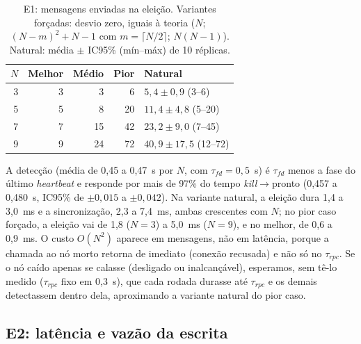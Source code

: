 \documentclass[conference,a4paper]{IEEEtran}
\begin{document}
\begin{table}[!ht]
\caption{E1: mensagens enviadas na eleição. Variantes forçadas: desvio zero, iguais à teoria ($N$; $(N-m)^2+N-1$ com $m=\lceil N/2\rceil$; $N(N-1)$). Natural: média $\pm$ IC95\% (mín--máx) de 10 réplicas.}
\label{tab:e1}
\centering
\footnotesize
\setlength{\tabcolsep}{4pt}
\begin{tabular}{@{}rrrrl@{}}
\toprule
$N$ & Melhor & Médio & Pior & Natural \\
\midrule
3 & 3 & 3 & 6 & $5{,}4\pm0{,}9$ (3--6) \\
5 & 5 & 8 & 20 & $11{,}4\pm4{,}8$ (5--20) \\
7 & 7 & 15 & 42 & $23{,}2\pm9{,}0$ (7--45) \\
9 & 9 & 24 & 72 & $40{,}9\pm17{,}5$ (12--72) \\
\bottomrule
\end{tabular}
\end{table}

A detecção (média de 0,45 a 0,47~s por $N$, com $\tau_{fd}=0{,}5$~s) é
$\tau_{fd}$ menos a fase do último \emph{heartbeat} e responde por mais de
97\% do tempo \emph{kill}$\to$pronto (0,457 a 0,480~s, IC95\% de $\pm0{,}015$ a
$\pm0{,}042$). Na variante natural, a eleição dura 1,4 a 3,0~ms e a
sincronização, 2,3 a 7,4~ms, ambas crescentes com $N$; no pior caso forçado, a
eleição vai de 1,8 ($N=3$) a 5,0~ms ($N=9$), e no melhor, de 0,6 a 0,9~ms.
O custo $O(N^2)$ aparece em mensagens, não em latência, porque a chamada ao
nó morto retorna de imediato (conexão recusada) e não só no $\tau_{rpc}$. Se o
nó caído apenas se calasse (desligado ou inalcançável), esperamos, sem tê-lo
medido ($\tau_{rpc}$ fixo em 0,3~s), que cada rodada durasse até $\tau_{rpc}$ e
os demais detectassem dentro dela, aproximando a variante natural do pior caso.

\subsection{E2: latência e vazão da escrita}
\end{document}
